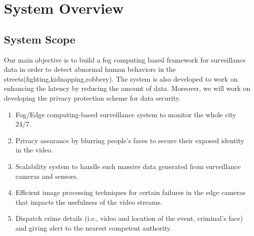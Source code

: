\documentclass[12pt]{article}
\begin{document}
\section{System Overview}


\subsection{System Scope}

Our main objective is to build a fog computing based framework for surveillance data in order to detect abnormal human behaviors in the streets(fighting,kidnapping,robbery). The system is also developed to work on enhancing the latency by reducing the amount of data. Moreover, we will work on developing the privacy protection scheme for data security.

\begin{enumerate}
\item Fog/Edge computing-based surveillance system to monitor the whole city 24/7.

\item Privacy assurance by blurring people’s faces to secure their exposed identity in the video.
\item Scalability system to handle such massive data generated from surveillance cameras and sensors.
\item Efficient image processing techniques for certain failures in the edge cameras that impacts the usefulness of the video streams.
\item Dispatch crime details (i.e., video and location of the event, criminal’s face) and giving alert to the nearest competent authority.



\end{enumerate} 
\end{document}
